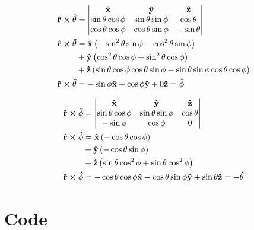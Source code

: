 \documentclass[x11names]{article}
\begin{document}
    \begin{align*}
      \vu{r} \cross \vu{\theta} &= 
      \begin{vmatrix}
        \vu{x} & \vu{y} & \vu{z}
        \\
        \sin\theta\cos\phi & \sin\theta\sin\phi & \cos\theta
        \\
        \cos\theta\cos\phi & \cos\theta\sin\phi & -\sin\theta
      \end{vmatrix}
      \\
      \vu{r} \cross \vu{\theta} &= \vu{x}\left( - \sin^2\theta\sin\phi - \cos^2\theta\sin\phi \right)
       \\& + \vu{y} \left( \cos^2\theta\cos\phi + \sin^2\theta\cos\phi \right)
       \\& + \vu{z} \left(\sin\theta\cos\phi \cos\theta\sin\phi - \sin\theta\sin\phi \cos\theta\cos\phi \right)
      \\
      \vu{r} \cross \vu{\theta} &= - \sin\phi \vu{x} + \cos\phi\vu{y}  + 0\vu{z} = \vu{\phi}
    \end{align*}

    \begin{align*}
      \vu{r} \cross \vu{\phi} &=
      \begin{vmatrix}
        \vu{x} & \vu{y} & \vu{z}
        \\
        \sin\theta\cos\phi & \sin\theta\sin\phi & \cos\theta
        \\
        -\sin\phi           & \cos\phi  & 0
      \end{vmatrix}
      \\
      \vu{r} \cross \vu{\phi} &=      \vu{x} \left( -\cos\theta\cos\phi           \right)
                                \\& + \vu{y} \left( -\cos\theta\sin\phi        \right)
                                \\& + \vu{z} \left( \sin\theta\cos^2\phi + \sin\theta \cos^2\phi        \right)
      \\
      \vu{r} \cross \vu{\phi} &= -\cos\theta\cos\phi \vu{x} -\cos\theta\sin\phi \vu{y} + \sin\theta \vu{z} = -\vu{\theta}
    \end{align*}


\section{Code}
  \label{sec:code}
  
\end{document}
